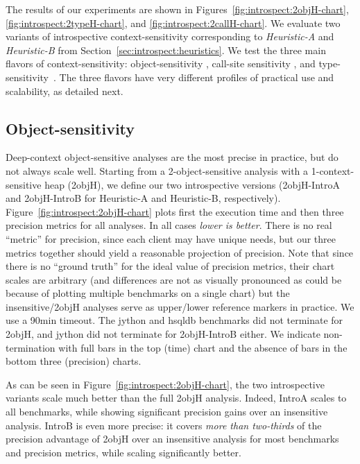 The results of our experiments are shown in Figures~\ref{fig:introspect:2objH-chart}, \ref{fig:introspect:2typeH-chart}, and \ref{fig:introspect:2callH-chart}. We evaluate two variants of introspective context-sensitivity corresponding to \emph{Heuristic-A} and \emph{Heuristic-B} from Section~\ref{sec:introspect:heuristics}. We test the three main flavors of context-sensitivity: object-sensitivity \cite{issta:2002:Milanova,article:2005:Milanova}, call-site sensitivity \cite{col:1981:Sharir,thesis:Shivers}, and type-sensitivity~\cite{popl:2011:Smaragdakis}. The three flavors have very different profiles of practical use and scalability, as detailed next.


\subsection{Object-sensitivity}
Deep-context object-sensitive analyses are the most precise in practice, but do not always scale well. Starting from a 2-object-sensitive analysis with a 1-context-sensitive heap (2objH), we define our two introspective versions (2objH-IntroA and 2objH-IntroB for Heuristic-A and Heuristic-B, respectively). Figure~\ref{fig:introspect:2objH-chart} plots first the execution time and then three precision metrics for all analyses. In all cases \emph{lower is better}. There is no real ``metric'' for precision, since each client may have unique needs, but our three metrics together should yield a reasonable projection of precision. Note that since there is no ``ground truth'' for the ideal value of precision metrics, their chart scales are arbitrary (and differences are not as visually pronounced as could be because of plotting multiple benchmarks on a single chart) but the insensitive/2objH analyses serve as upper/lower reference markers in practice. We use a 90min timeout. The jython and hsqldb benchmarks did not terminate for 2objH, and jython did not terminate for 2objH-IntroB either. We indicate non-termination with full bars in the top (time) chart and the absence of bars in the bottom three (precision) charts.

As can be seen in Figure~\ref{fig:introspect:2objH-chart}, the two introspective variants scale much better than the full 2objH analysis. Indeed, IntroA scales to all benchmarks, while showing significant precision gains over an insensitive analysis. IntroB is even more precise: it covers \emph{more than two-thirds} of the precision advantage of 2objH over an insensitive analysis for most benchmarks and precision metrics, while scaling significantly better.


